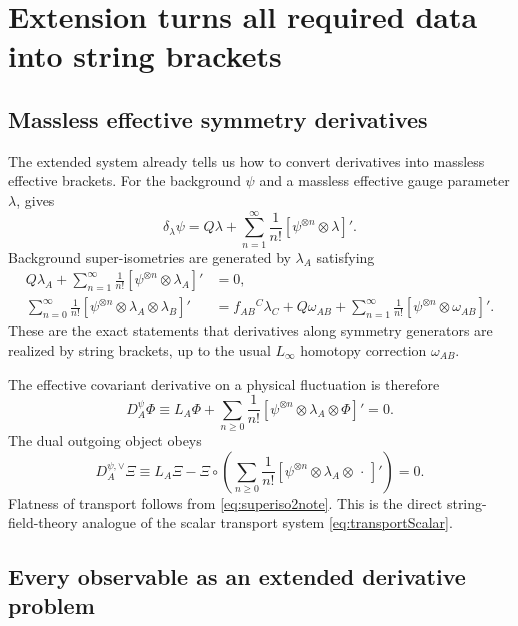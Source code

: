 \documentclass[11pt]{article}
\begin{document}
\section{Extension turns all required data into string brackets}

\subsection{Massless effective symmetry derivatives}

The extended system already tells us how to convert derivatives into massless effective brackets. For the background $\psi$ and a massless effective gauge parameter $\lambda$, \cite{CGSY} gives
\begin{equation}
\delta_\lambda \psi
=
Q\lambda+\sum_{n=1}^\infty \frac{1}{n!}[\psi^{\otimes n}\otimes \lambda]'.
\label{eq:variationMasslessNote}
\end{equation}
Background super-isometries are generated by $\lambda_A$ satisfying
\begin{align}
Q\lambda_A+\sum_{n=1}^\infty \frac{1}{n!}[\psi^{\otimes n}\otimes \lambda_A]'&=0,
\label{eq:superiso1note}\\
\sum_{n=0}^\infty \frac{1}{n!}[\psi^{\otimes n}\otimes \lambda_A\otimes \lambda_B]'
&=
f_{AB}{}^C\lambda_C
+Q\omega_{AB}
+\sum_{n=1}^\infty \frac{1}{n!}[\psi^{\otimes n}\otimes \omega_{AB}]'.
\label{eq:superiso2note}
\end{align}
These are the exact statements that derivatives along symmetry generators are realized by string brackets, up to the usual $L_\infty$ homotopy correction $\omega_{AB}$.

The effective covariant derivative on a physical fluctuation is therefore
\begin{equation}
D_A^\psi \Phi
\equiv
L_A\Phi
+\sum_{n\ge 0}\frac{1}{n!}
[\psi^{\otimes n}\otimes \lambda_A\otimes \Phi]'
=0.
\label{eq:transportSFT}
\end{equation}
The dual outgoing object obeys
\begin{equation}
D_A^{\psi,\vee}\Xi
\equiv
L_A\Xi-\Xi\circ
\left(
\sum_{n\ge 0}\frac{1}{n!}
[\psi^{\otimes n}\otimes \lambda_A\otimes \,\cdot\,]'
\right)
=0.
\label{eq:transportDualSFT}
\end{equation}
Flatness of transport follows from \cref{eq:superiso2note}. This is the direct string-field-theory analogue of the scalar transport system \cref{eq:transportScalar}.

\subsection{Every observable as an extended derivative problem}
\end{document}
